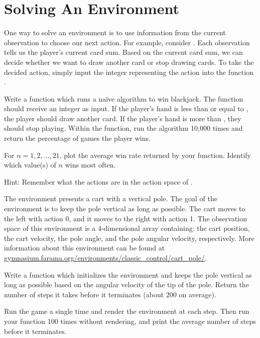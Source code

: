 \section*{Solving An Environment}

One way to solve an environment is to use information from the current observation to choose our next action.
For example, consider .
Each observation tells us the player's current card sum.
Based on the current card sum, we can decide whether we want to draw another card or stop drawing cards.
To take the decided action, simply input the integer representing the action into the function .

\begin{problem}
Write a function  which runs a na\"{i}ve algorithm to win blackjack.
The function should receive an integer  as input.
If the player's hand is less than or equal to , the player should draw another card.
If the player's hand is more than , they should stop playing.
Within the function, run the algorithm 10,000 times and return the percentage of games the player wins.

For $n=1,2,\ldots,21$, plot the average win rate returned by your function. 
Identify which value(s) of $n$ wins most often.

\noindent Hint: Remember what the actions are in the action space of .
\label{prob:blackjack}
\end{problem}

\begin{problem}
The environment  presents a cart with a vertical pole.
The goal of the environment is to keep the pole vertical as long as possible.
The cart moves to the left with action 0, and it moves to the right with action 1.
The observation space of this environment is a 4-dimensional array containing: the cart position, the cart velocity, the pole angle, and the pole angular velocity, respectively.
More information about this environment can be found at \url{gymnasium.farama.org/environments/classic_control/cart_pole/}.

Write a function  which initializes the  environment and keeps the pole vertical as long as possible based on the angular velocity of the tip of the pole.
Return the number of steps it takes before it terminates (about 200 on average).

Run the game a single time and render the environment at each step. 
Then run your function 100 times without rendering, and print the average number of steps before it terminates.

\label{prob:cartpole}
\end{problem}

